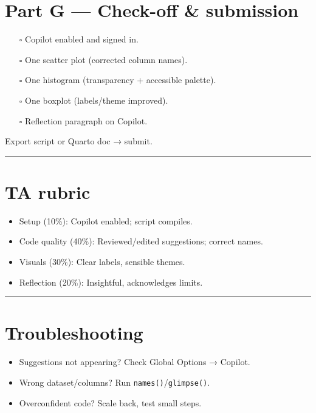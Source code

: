 \documentclass[
  letterpaper,
  DIV=11,
  numbers=noendperiod]{scrreprt}
\providecommand{\tightlist}{%
  \setlength{\itemsep}{0pt}\setlength{\parskip}{0pt}}
\begin{document}
\section{Part G --- Check-off \&
submission}\label{part-g-check-off-submission}

\begin{itemize}
\tightlist
\item[$\square$]
  Copilot enabled and signed in.
\item[$\square$]
  One scatter plot (corrected column names).
\item[$\square$]
  One histogram (transparency + accessible palette).
\item[$\square$]
  One boxplot (labels/theme improved).
\item[$\square$]
  Reflection paragraph on Copilot.
\end{itemize}

Export script or Quarto doc → submit.

\begin{center}\rule{0.5\linewidth}{0.5pt}\end{center}

\section{TA rubric}\label{ta-rubric}

\begin{itemize}
\tightlist
\item
  Setup (10\%): Copilot enabled; script compiles.
\item
  Code quality (40\%): Reviewed/edited suggestions; correct names.
\item
  Visuals (30\%): Clear labels, sensible themes.
\item
  Reflection (20\%): Insightful, acknowledges limits.
\end{itemize}

\begin{center}\rule{0.5\linewidth}{0.5pt}\end{center}

\section{Troubleshooting}\label{troubleshooting}

\begin{itemize}
\tightlist
\item
  Suggestions not appearing? Check Global Options → Copilot.
\item
  Wrong dataset/columns? Run \texttt{names()}/\texttt{glimpse()}.
\item
  Overconfident code? Scale back, test small steps.
\end{itemize}
\end{document}
